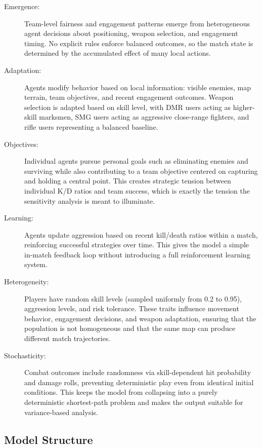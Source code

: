 \documentclass{assignment}
\begin{document}
\begin{description}
  \item[Emergence:] Team-level fairness and engagement patterns emerge from heterogeneous agent decisions about positioning, weapon selection, and engagement timing. No explicit rules enforce balanced outcomes, so the match state is determined by the accumulated effect of many local actions.
  
  \item[Adaptation:] Agents modify behavior based on local information: visible enemies, map terrain, team objectives, and recent engagement outcomes. Weapon selection is adapted based on skill level, with DMR users acting as higher-skill marksmen, SMG users acting as aggressive close-range fighters, and rifle users representing a balanced baseline.
  
  \item[Objectives:] Individual agents pursue personal goals such as eliminating enemies and surviving while also contributing to a team objective centered on capturing and holding a central point. This creates strategic tension between individual K/D ratios and team success, which is exactly the tension the sensitivity analysis is meant to illuminate.
  
  \item[Learning:] Agents update aggression based on recent kill/death ratios within a match, reinforcing successful strategies over time. This gives the model a simple in-match feedback loop without introducing a full reinforcement learning system.
  
  \item[Heterogeneity:] Players have random skill levels (sampled uniformly from 0.2 to 0.95), aggression levels, and risk tolerance. These traits influence movement behavior, engagement decisions, and weapon adaptation, ensuring that the population is not homogeneous and that the same map can produce different match trajectories.
  
  \item[Stochasticity:] Combat outcomes include randomness via skill-dependent hit probability and damage rolls, preventing deterministic play even from identical initial conditions. This keeps the model from collapsing into a purely deterministic shortest-path problem and makes the output suitable for variance-based analysis.
\end{description}

\subsection{Model Structure}
\end{document}
